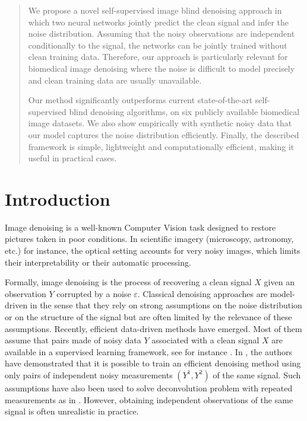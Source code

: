 \documentclass{article}
\begin{document}
\printAffiliationsAndNotice{}  %


\begin{abstract}
We propose a novel self-supervised image blind denoising approach in which two neural networks jointly predict the clean signal and infer the noise distribution.
Assuming that the noisy observations are independent conditionally to the signal, the networks can be jointly trained without clean training data. Therefore, our approach is particularly relevant for biomedical image denoising where the noise is difficult to model precisely and clean training data are usually unavailable.

Our method significantly outperforms current state-of-the-art self-supervised blind denoising algorithms, on six publicly available biomedical image datasets. We also show empirically with synthetic noisy data that our model captures the noise distribution efficiently. Finally, the described framework is simple, lightweight and computationally efficient, making it useful in practical cases.
\end{abstract}

\section{Introduction}
\label{sec:introduction}

Image denoising is a well-known Computer Vision task designed to restore pictures taken in poor conditions. In scientific imagery (microscopy, astronomy, etc.) for instance,  the optical setting accounts for very noisy images, which limits their interpretability or their automatic processing.

Formally, image denoising is the process of recovering a clean signal $X$ given an observation $Y$ corrupted by a noise $\varepsilon$. Classical denoising approaches are model-driven in the sense that they rely on strong assumptions on the noise distribution or on the structure of the signal but are often limited by the relevance of these assumptions.
Recently, efficient data-driven methods have emerged. Most of them assume that pairs made of noisy data $Y$ associated with a clean signal $X$ are available in a supervised learning framework, see for instance \cite{weigert2017content}. In \cite{lehtinen2018noise2noise}, the authors have demonstrated that it is possible to train an efficient denoising method using only pairs of independent noisy measurements $(Y^1, Y^2)$ of the same signal. Such assumptions have also been used to solve deconvolution problem with repeated measurements as in \cite{delaigle2008deconvolution}. However, obtaining independent observations of the same signal is often unrealistic in practice.
\end{document}
